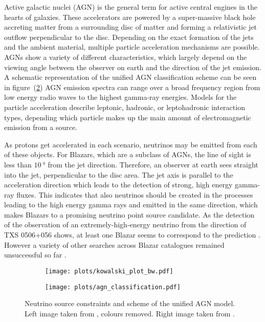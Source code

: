 Active galactic nuclei (AGN) is the general term for active central engines in the hearts of galaxies.
These accelerators are powered by a super-massive black hole accreting matter from a surrounding disc of matter and forming a relativistic jet outflow perpendicular to the disc.
Depending on the exact formation of the jets and the ambient material, multiple particle acceleration mechanisms are possible.
AGNs show a variety of different characteristics, which largely depend on the viewing angle between the observer on earth and the direction of the jet emission.
A schematic representation of the unified AGN classification scheme can be seen in figure~(\ref{fig:astro_agns})
AGN emission spectra can range over a broad frequency region from low energy radio waves to the highest gamma-ray energies.
Models for the particle acceleration describe leptonic, hadronic, or leptohadronic interaction types, depending which particle makes up the main amount of electromagnetic emission from a source.

As protons get accelerated in each scenario, neutrinos may be emitted from each of these objects.
For Blazars, which are a subclass of AGNs, the line of sight is less than $\SI{10}{\degree}$ from the jet direction.
Therefore, an observer at earth sees straight into the jet, perpendicular to the disc area.
The jet axis is parallel to the acceleration direction which leads to the detection of strong, high energy gamma-ray fluxes.
This indicates that also neutrinos should be created in the processes leading to the high energy gamma rays and emitted in the same direction, which makes Blazars to a promising neutrino point source candidate.
As the detection of the observation of an extremely-high-energy neutrino from the direction of TXS 0506+056 shows, at least one Blazar seems to correspond to the prediction \cite{Keivani:2018rnh,Gao:2018mnu}.
However a variety of other searches across Blazar catalogues remained unsuccessful so far \cite{Meagher:2017omt,Huber:2017wxt}.

\begin{figure}[htbp]
  \centering
  \begin{subfigure}[t]{0.49\textwidth}
    \centering
    \texttt{[image: plots/kowalski\_plot\_bw.pdf]}
    \label{fig:astro_kowalski_plot}
  \end{subfigure}
  \hfill
  \begin{subfigure}[t]{0.49\textwidth}
    \centering
    \texttt{[image: plots/agn\_classification.pdf]}
    \label{fig:astro_agns}
  \end{subfigure}
  \label{fig:agns_and_kowalski}
  \caption[Neutrino source constraints and unified AGN model.]{Neutrino source constraints and scheme of the unified AGN model. Left image taken from \cite{Kowalski:2014zda}, colours removed. Right image taken from \cite{Beckmann:2013wte}.}
\end{figure}


